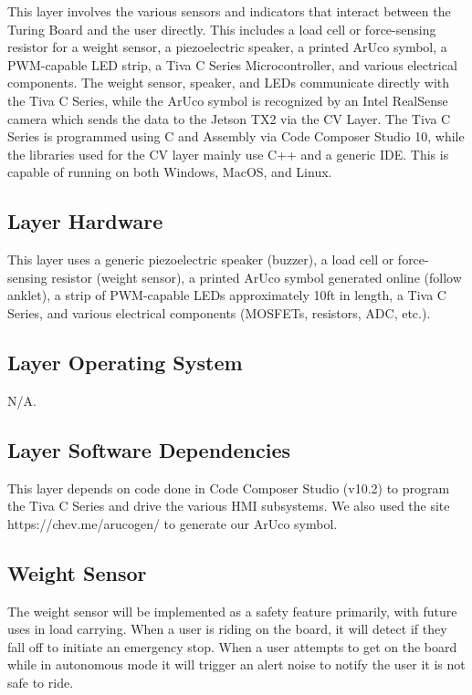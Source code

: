This layer involves the various sensors and indicators that interact between the Turing Board and the user directly. This includes a load cell or force-sensing resistor for a weight sensor, a piezoelectric speaker, a printed ArUco symbol, a PWM-capable LED strip, a Tiva C Series Microcontroller, and various electrical components. The weight sensor, speaker, and LEDs communicate directly with the Tiva C Series, while the ArUco symbol is recognized by an Intel RealSense camera which sends the data to the Jetson TX2 via the CV Layer. The Tiva C Series is programmed using C and Assembly via Code Composer Studio 10, while the libraries used for the CV layer mainly use C++ and a generic IDE. This is capable of running on both Windows, MacOS, and Linux.

\subsection{Layer Hardware}
This layer uses a generic piezoelectric speaker (buzzer), a load cell or force-sensing resistor (weight sensor), a printed ArUco symbol generated online (follow anklet), a strip of PWM-capable LEDs approximately 10ft in length, a Tiva C Series, and various electrical components (MOSFETs, resistors, ADC, etc.).

\subsection{Layer Operating System}
N/A.

\subsection{Layer Software Dependencies}
This layer depends on code done in Code Composer Studio (v10.2) to program the Tiva C Series and drive the various HMI subsystems. We also used the site https://chev.me/arucogen/ to generate our ArUco symbol.

\subsection{Weight Sensor}
The weight sensor will be implemented as a safety feature primarily, with future uses in load carrying. When a user is riding on the board, it will detect if they fall off to initiate an emergency stop. When a user attempts to get on the board while in autonomous mode it will trigger an alert noise to notify the user it is not safe to ride.


